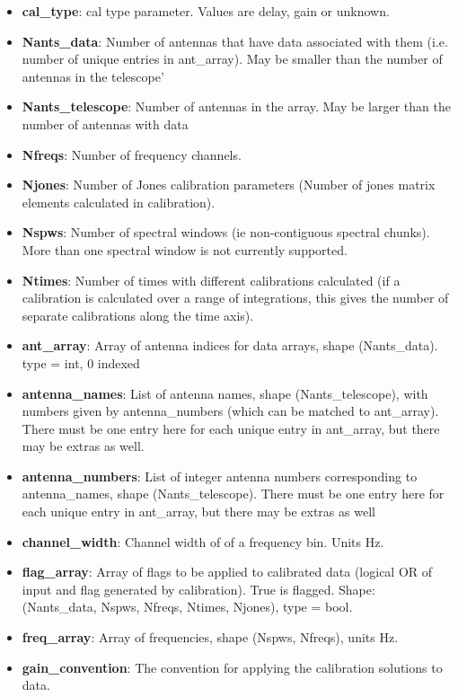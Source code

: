 \documentclass[11pt, oneside]{article}   	%
\begin{document}
\begin{itemize}
\item{\textbf{cal\_type}: cal type parameter. Values are delay, gain or
    unknown.}
\item{\textbf{Nants\_data}: Number of antennas that have data associated with them 
    (i.e. number of unique entries in ant\_array). May be smaller than the number of 
    antennas in the telescope'}
\item{\textbf{Nants\_telescope}: Number of antennas in the array. May be larger
    than the number of antennas with data}
\item{\textbf{Nfreqs}: Number of frequency channels.}
\item{\textbf{Njones}: Number of Jones calibration parameters (Number of
    jones matrix elements calculated in calibration).}
\item{\textbf{Nspws}: Number of spectral windows (ie non-contiguous spectral
    chunks). More than one spectral window is not currently supported.}
\item{\textbf{Ntimes}: Number of times with different calibrations calculated
    (if a calibration is calculated over a range of integrations, this gives the
    number of separate calibrations along the time axis).}
\item{\textbf{ant\_array}: Array of antenna indices for data arrays, shape
    (Nants\_data). type = int, 0 indexed}
\item{\textbf{antenna\_names}: List of antenna names, shape (Nants\_telescope),
    with numbers given by antenna\_numbers (which can be matched to ant\_array).
    There must be one entry here for each unique entry in ant\_array, but there may be extras as well.}
\item{\textbf{antenna\_numbers}: List of integer antenna numbers corresponding
    to antenna\_names, shape (Nants\_telescope). There must be one entry here for each unique entry 
    in ant\_array, but there may be extras as well}
\item{\textbf{channel\_width}: Channel width of of a frequency bin. Units Hz.}
\item{\textbf{flag\_array}: Array of flags to be applied to calibrated data
    (logical OR of input and flag generated by calibration). True is flagged.
    Shape: (Nants\_data, Nspws, Nfreqs, Ntimes, Njones), type = bool.}
\item{\textbf{freq\_array}: Array of frequencies, shape (Nspws, Nfreqs), units
    Hz.}
\item{\textbf{gain\_convention}: The convention for applying the calibration solutions to data.
}
\end{itemize}
\end{document}
